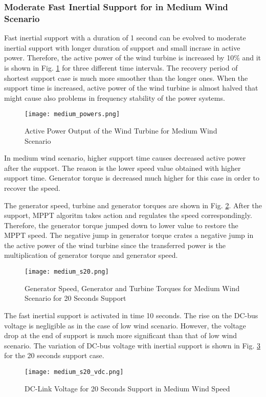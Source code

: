 \subsubsection{Moderate Fast Inertial Support for in Medium Wind Scenario}
Fast inertial support with a duration of 1 second can be evolved to moderate inertial support with longer duration of support and small incrase in active power. Therefore, the active power of the wind turbine is increased by 10\% and it is shown in Fig. \ref{midpowers} for three different time intervals. The recovery period of shortest support case is much more smoother than the longer ones. When the support time is increased, active power of the wind turbine is almost halved that might cause also problems in frequency stability of the power systems. \par
\begin{figure}[h!]
	\centering
	\texttt{[image: medium\_powers.png]}
	\caption{Active Power Output of the Wind Turbine for Medium Wind Scenario}
	\label{midpowers}
\end{figure}
In medium wind scenario, higher support time causes decreased active power after the support. The reason is the lower speed value obtained with higher support time. Generator torque is decreased much higher for this case in order to recover the speed. \par
The generator speed, turbine and generator torques are shown in Fig. \ref{mid_torques3}. After the support, MPPT algoritm takes action and regulates the speed correspondingly. Therefore, the generator torque jumped down to lower value to restore the MPPT speed. The negative jump in generator torque crates a negative jump in the active power of the wind turbine since the transferred power is the multiplication of generator torque and generator speed.\par
\begin{figure}[h!]
	\centering
	\texttt{[image: medium\_s20.png]}
	\caption{Generator Speed, Generator and Turbine Torques for Medium Wind Scenario for 20 Seconds Support}
	\label{mid_torques3}
\end{figure}
The fast inertial support is activated in time 10 seconds. The rise on the DC-bus voltage is negligible as in the case of low wind scenario. However, the voltage drop at the end of support is much more significant than that of low wind scenario. The variation of DC-bus voltage with inertial support is shown in Fig. \ref{med_vdc_s20} for the 20 seconds support case.
\begin{figure}[h!]
	\centering
	\texttt{[image: medium\_s20\_vdc.png]}
	\caption{DC-Link Voltage for 20 Seconds Support in Medium Wind Speed}
	\label{med_vdc_s20}
\end{figure}
